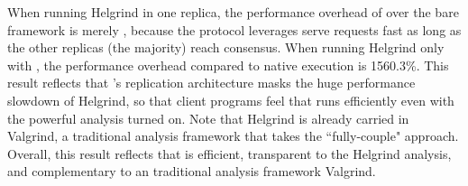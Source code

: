 When running Helgrind in one replica, the performance overhead of \xxx over the 
bare framework is merely \overhead, because the \paxos protocol \xxx leverages 
serve requests fast as long as the other replicas (the majority) reach 
consensus. When running Helgrind only with \mediatomb, the performance overhead 
compared to native execution is 1560.3\%. This result reflects that \xxx's 
replication architecture masks the huge performance slowdown of Helgrind, so 
that client programs feel that \mediatomb runs efficiently even with the 
powerful analysis turned on. Note that Helgrind is already carried in Valgrind, 
a traditional analysis framework that takes the ``fully-couple" approach. 
Overall, this result reflects that \xxx is efficient, transparent to the 
Helgrind analysis, and complementary to an traditional analysis framework 
Valgrind.
